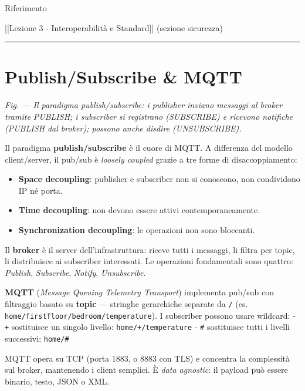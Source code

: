 \documentclass[
  italian,
  openany]{book}
\providecommand{\tightlist}{%
  \setlength{\itemsep}{0pt}\setlength{\parskip}{0pt}}
\begin{document}
\begin{calloutnote}{Riferimento}

{[}{[}Lezione 3 - Interoperabilità e Standard{]}{]} (sezione sicurezza)

\end{calloutnote}

\begin{center}\rule{0.5\linewidth}{0.5pt}\end{center}

\section{Publish/Subscribe \& MQTT}\label{publishsubscribe-mqtt}

\emph{Fig. --- Il paradigma publish/subscribe: i publisher inviano
messaggi al broker tramite PUBLISH; i subscriber si registrano
(SUBSCRIBE) e ricevono notifiche (PUBLISH dal broker); possono anche
disdire (UNSUBSCRIBE).}

Il paradigma \textbf{publish/subscribe} è il cuore di MQTT. A differenza
del modello client/server, il pub/sub è \emph{loosely coupled} grazie a
tre forme di disaccoppiamento:

\begin{itemize}
\tightlist
\item
  \textbf{Space decoupling}: publisher e subscriber non si conoscono,
  non condividono IP né porta.
\item
  \textbf{Time decoupling}: non devono essere attivi contemporaneamente.
\item
  \textbf{Synchronization decoupling}: le operazioni non sono bloccanti.
\end{itemize}

Il \textbf{broker} è il server dell'infrastruttura: riceve tutti i
messaggi, li filtra per topic, li distribuisce ai subscriber
interessati. Le operazioni fondamentali sono quattro: \emph{Publish},
\emph{Subscribe}, \emph{Notify}, \emph{Unsubscribe}.

\textbf{MQTT} (\emph{Message Queuing Telemetry Transport}) implementa
pub/sub con filtraggio basato su \textbf{topic} --- stringhe gerarchiche
separate da \texttt{/} (es.
\texttt{home/firstfloor/bedroom/temperature}). I subscriber possono
usare wildcard: - \texttt{+} sostituisce un singolo livello:
\texttt{home/+/temperature} - \texttt{\#} sostituisce tutti i livelli
successivi: \texttt{home/\#}

MQTT opera su TCP (porta 1883, o 8883 con TLS) e concentra la
complessità sul broker, mantenendo i client semplici. È \emph{data
agnostic}: il payload può essere binario, testo, JSON o XML.
\end{document}
